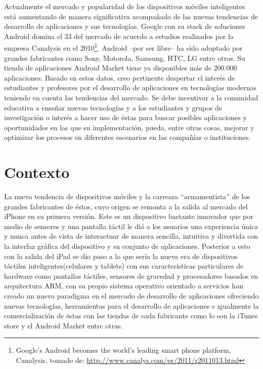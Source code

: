 \documentclass[letterpaper,12pt]{book}
\begin{document}
\begin{mainmatter}
Actualmente  el  mercado y  popularidad  de  los dispositivos  móviles
inteligentes está aumentando de manera significativa acompañado de las
nuevas    tendencias   de   desarrollo    de   aplicaciones    y   sus
tecnologías. Google con su stack  de soluciones Android domina el 33 %
del mercado de acuerdo a  estudios realizados por la empresa Canalysis
en  el 2010\footnote{  Google’s  Android becomes  the world’s  leading
smart       phone      platform,      Canalysis,       tomado      de:
\url{http://www.canalys.com/pr/2011/r2011013.html}  }.   Android --por
ser  libre--  ha sido  adoptado  por  grandes  fabricantes como  Sony,
Motorola,  Samsung, HTC,  LG entre  otros. Su  tienda  de aplicaciones
Android    Market    tiene    ya    disponibles   más    de    200.000
aplicaciones.  Basado en  estos  datos, creo  pertinente despertar  el
interés de estudiantes y  profesores por el desarrollo de aplicaciones
en tecnologías modernas teniendo en cuenta las tendencias del mercado.
Se  debe  incentivar  a   la  comunidad  educativa  a  enseñar  nuevas
tecnologías y a los estudiantes  y grupos de investigación o interés a
hacer uso  de éstas para buscar posibles  aplicaciones y oportunidades
en  las que  su implementación,  pueda, entre  otras cosas,  mejorar y
optimizar los procesos en diferentes escenarios en las compañías o instituciones.


\section{Contexto}

La   nueva   tendencia  de   dispositivos   móviles   y  la   carreara
“armamentista”  de los grandes  fabricantes de  éstos, cuyo  origen se
remonta a la salida al mercado del iPhone en su primera versión.  Este
es un dispositivo  bastante innovador que por medio  de sensores y una
pantalla táctil  le dió a los  usuarios una experiencia  única y nunca
antes  de  vista  de  interactuar  de  manera  sencilla,  intuitiva  y
divertida con  la interfaz  gráfica del dispositivo  y su  conjunto de
aplicaciones. Posterior a esto con la salida del iPad se dio paso a lo
que sería la nueva era de dispositivos táctiles inteligentes(celulares
y  tablets)  con sus  características  particulares  de hardware  como
pantallas  táctiles, sensores  de gravedad  y procesadores  basados en
arquitectura  ARM,  con  su   propio  sistema  operativo  orientado  a
servicios han creado un nuevo paradigma en el mercado de desarrollo de
aplicaciones  ofreciendo  nuevas  tecnologías,  herramientas  para  el
desarrollo de  aplicaciones e igualmente la  comercialización de éstas
con las  tiendas de cada fabricante como  lo son la iTunes  store y el
Android Market entre otras.


\end{mainmatter}
\end{document}
